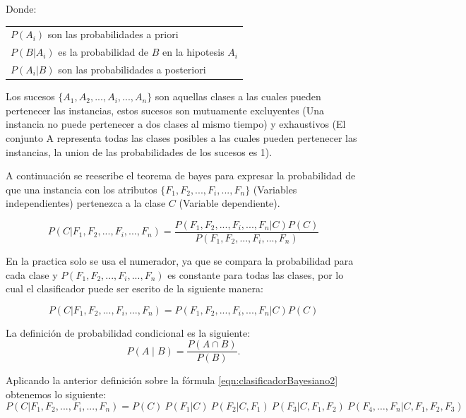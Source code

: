 \documentclass[11pt,fleqn]{book} %
\begin{document}
Donde:

\begin{tabular}{l}
	$P(A_{i})$ son las probabilidades a priori\\
	$P(B|A_{i})$ es la probabilidad de $B$ en la hipotesis $A_{i}$\\
	$P(A_{i}|B)$ son las probabilidades a posteriori\\
\end{tabular}

Los sucesos $\{A_{1},A_{2},...,A_{i},...,A_{n}\}$ son aquellas clases a las cuales pueden pertenecer las instancias, estos sucesos son mutuamente excluyentes (Una instancia no puede pertenecer a dos clases al mismo tiempo) y exhaustivos (El conjunto A representa todas las clases posibles a las cuales pueden pertenecer las instancias, la union de las probabilidades de los sucesos es 1).

A continuación se reescribe el teorema de bayes para expresar la probabilidad de que una instancia con los atributos $\{F_{1},F_{2},...,F_{i},...,F_{n}\}$ (Variables independientes) pertenezca a la clase $C$ (Variable dependiente).

\begin{equation}
P(C|F_{1},F_{2},...,F_{i},...,F_{n}) = \frac{P(F_{1},F_{2},...,F_{i},...,F_{n}|C) P(C)}{P(F_{1},F_{2},...,F_{i},...,F_{n})}
\label{eqn:clasificadorBayesiano1} 
\end{equation}

En la practica solo se usa el numerador, ya que se compara la probabilidad para cada clase y $P(F_{1},F_{2},...,F_{i},...,F_{n})$ es constante para todas las clases, por lo cual el clasificador puede ser escrito de la siguiente manera:

\begin{equation}
P(C|F_{1},F_{2},...,F_{i},...,F_{n}) = P(F_{1},F_{2},...,F_{i},...,F_{n}|C) P(C)
\label{eqn:clasificadorBayesiano2} 
\end{equation}

La definición de probabilidad condicional es la siguiente:
\begin{equation}
P(A \mid B) = \frac{P(A \cap B)}{P(B)}.
\label{eqn:probabilidadCondicional} 
\end{equation}

Aplicando la anterior definición sobre la fórmula \ref{eqn:clasificadorBayesiano2} obtenemos lo siguiente:
\begin{equation}
P(C|F_{1},F_{2},...,F_{i},...,F_{n}) = P(C) \ P(F_1\vert C) \ P(F_2\vert C, F_1) \ P(F_3\vert C, F_1, F_2) \ P(F_4,\dots,F_n\vert C, F_1, F_2, F_3)
\label{eqn:clasificadorBayesiano3} 
\end{equation}
\end{document}
